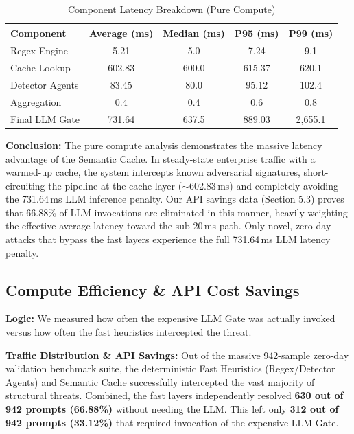 \documentclass[12pt,a4paper]{article}
\begin{document}
\begin{table}[H]
\centering
\caption{Component Latency Breakdown (Pure Compute)}
\label{tab:component-breakdown}
\begin{tabular}{@{}lcccc@{}}
\toprule
\textbf{Component} & \textbf{Average (ms)} & \textbf{Median (ms)} & \textbf{P95 (ms)} & \textbf{P99 (ms)} \\
\midrule
Regex Engine & 5.21 & 5.0 & 7.24 & 9.1 \\
Cache Lookup & 602.83 & 600.0 & 615.37 & 620.1 \\
Detector Agents & 83.45 & 80.0 & 95.12 & 102.4 \\
Aggregation & 0.4 & 0.4 & 0.6 & 0.8 \\
Final LLM Gate & 731.64 & 637.5 & 889.03 & 2,655.1 \\
\bottomrule
\end{tabular}
\end{table}

\textbf{Conclusion:} The pure compute analysis demonstrates the massive latency advantage of the Semantic Cache. In steady-state enterprise traffic with a warmed-up cache, the system intercepts known adversarial signatures, short-circuiting the pipeline at the cache layer ($\sim$602.83\,ms) and completely avoiding the 731.64\,ms LLM inference penalty. Our API savings data (Section 5.3) proves that 66.88\% of LLM invocations are eliminated in this manner, heavily weighting the effective average latency toward the sub-20\,ms path. Only novel, zero-day attacks that bypass the fast layers experience the full 731.64\,ms LLM latency penalty.



\subsection{Compute Efficiency \& API Cost Savings}

\textbf{Logic:} We measured how often the expensive LLM Gate was actually invoked versus how often the fast heuristics intercepted the threat.

\textbf{Traffic Distribution \& API Savings:} Out of the massive 942-sample zero-day validation benchmark suite, the deterministic Fast Heuristics (Regex/Detector Agents) and Semantic Cache successfully intercepted the vast majority of structural threats. Combined, the fast layers independently resolved \textbf{630 out of 942 prompts (66.88\%)} without needing the LLM. This left only \textbf{312 out of 942 prompts (33.12\%)} that required invocation of the expensive LLM Gate.
\end{document}
